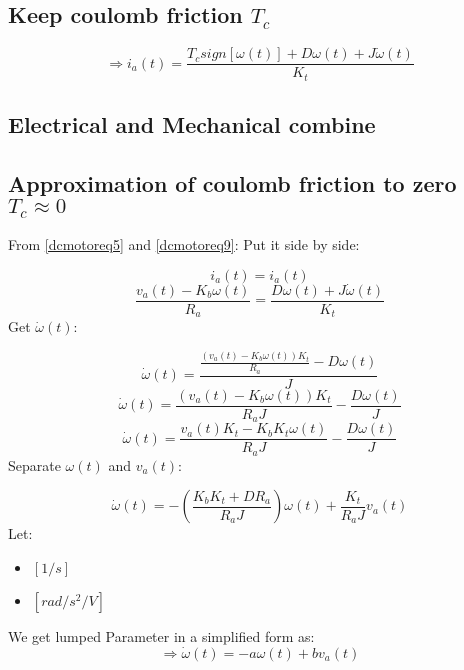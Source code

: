 \subsection{Keep coulomb friction \(T_c\)}
\begin{equation}
	\Rightarrow \boxed{i_a(t) = \frac{T_c sign[\omega(t)] + D\omega(t) + J \dot{\omega}(t)}{K_t}}
	\label{dcmotoreq10}
\end{equation}

\subsection{Electrical and Mechanical combine}
\subsection{Approximation of coulomb friction to zero \(T_c \approx 0\)}

From \autoref{dcmotoreq5} and \autoref{dcmotoreq9}: Put it side by side:

\[i_a(t) = i_a(t)\]
\[\frac{v_a(t) - K_b \omega(t)}{R_a} = \frac{D\omega(t) + J \dot{\omega}(t)}{K_t}\]
Get \(\dot{\omega}(t)\):

\[\dot{\omega}(t) = \frac{\frac{(v_a(t) - K_b \omega(t))K_t}{R_a} - D\omega(t)}{J}\]
\[\dot{\omega}(t) = \frac{(v_a(t) - K_b \omega(t))K_t}{R_a J} - \frac{D\omega(t)}{J}\]
\[\dot{\omega}(t) = \frac{v_a(t) K_t - K_b K_t\omega(t)}{R_a J} - \frac{D\omega(t)}{J}\]
Separate \(\omega(t)\) and \(v_a(t)\):

\begin{tcolorbox}[title=Lumped Parameters without Friction]
	\begin{equation}
		\dot{\omega}(t) = - (\frac{K_b K_t + D R_a}{R_a J})\omega(t) + \frac{K_t}{R_a J}v_a(t)
		\label{dcmotoreq11}
	\end{equation}
	Let:
	\begin{itemize}
		\item { \([1/s]\) }
		\item { \([rad/s^2/V]\) }
	\end{itemize}
	We get lumped Parameter in a simplified form as:
	\begin{equation}
		\Rightarrow \dot{\omega}(t) = - a\omega(t) + bv_a(t)
		\label{dcmotoreq12}
	\end{equation}
\end{tcolorbox}



